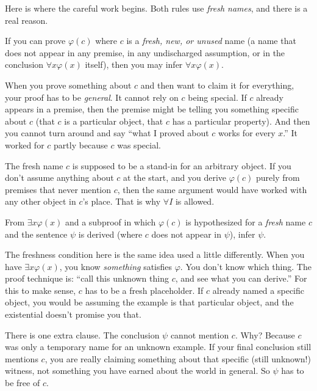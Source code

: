 \documentclass[11pt]{article}
\begin{document}
Here is where the careful work begins. Both rules use \emph{fresh names}, and there is a real reason.

\begin{template}
If you can prove $\varphi(c)$ where $c$ is a \emph{fresh, new, or unused} name (a name that does not appear in any premise, in any undischarged assumption, or in the conclusion $\forall x \varphi(x)$ itself), then you may infer $\forall x \varphi(x)$.
\end{template}

When you prove something about $c$ and then want to claim it for everything, your proof has to be \emph{general}. It cannot rely on $c$ being special. If $c$ already appears in a premise, then the premise might be telling you something specific about $c$ (that $c$ is a particular object, that $c$ has a particular property). And then you cannot turn around and say ``what I proved about $c$ works for every $x$.'' It worked for $c$ partly because $c$ was special.

The fresh name $c$ is supposed to be a stand-in for an arbitrary object. If you don't assume anything about $c$ at the start, and you derive $\varphi(c)$ purely from premises that never mention $c$, then the same argument would have worked with any other object in $c$'s place. That is why $\forall I$ is allowed.

\begin{template}
From $\exists x \varphi(x)$ and a subproof in which $\varphi(c)$ is hypothesized for a \emph{fresh} name $c$ and the sentence $\psi$ is derived (where $c$ does not appear in $\psi$), infer $\psi$.
\end{template}

The freshness condition here is the same idea used a little differently. When you have $\exists x \varphi(x)$, you know \emph{something} satisfies $\varphi$. You don't know which thing. The proof technique is: ``call this unknown thing $c$, and see what you can derive.'' For this to make sense, $c$ has to be a fresh placeholder. If $c$ already named a specific object, you would be assuming the example is that particular object, and the existential doesn't promise you that.

There is one extra clause. The conclusion $\psi$ cannot mention $c$. Why? Because $c$ was only a temporary name for an unknown example. If your final conclusion still mentions $c$, you are really claiming something about that specific (still unknown!) witness, not something you have earned about the world in general. So $\psi$ has to be free of $c$.
\end{document}
